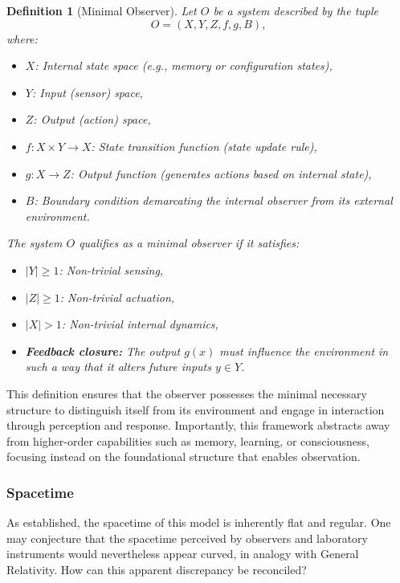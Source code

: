 \documentclass{ijuc}
\newtheorem{definition}{Definition}[section]
\begin{document}
\begin{definition}[Minimal Observer]
Let $O$ be a system described by the tuple
\[
O = (X, Y, Z, f, g, B),
\]
where:
\begin{itemize}
    \item $X$: Internal state space (e.g., memory or configuration states),
    \item $Y$: Input (sensor) space,
    \item $Z$: Output (action) space,
    \item $f: X \times Y \rightarrow X$: State transition function (state update rule),
    \item $g: X \rightarrow Z$: Output function (generates actions based on internal state),
    \item $B$: Boundary condition demarcating the internal observer from its external environment.
\end{itemize}

The system $O$ qualifies as a \emph{minimal observer} if it satisfies:
\begin{itemize}
    \item $|Y| \geq 1$: Non-trivial sensing,
    \item $|Z| \geq 1$: Non-trivial actuation,
    \item $|X| > 1$: Non-trivial internal dynamics,
    \item \textbf{Feedback closure:} The output $g(x)$ must influence the environment in such a way that it alters future inputs $y \in Y$.
\end{itemize}
\end{definition}

This definition ensures that the observer possesses the minimal necessary structure to distinguish itself from its environment and engage in interaction through perception and response. 
Importantly, this framework abstracts away from higher-order capabilities such as memory, learning, or consciousness, focusing instead on the foundational structure that enables observation.

\subsubsection{Spacetime}
As established, the spacetime of this model is inherently flat and regular. 
One may conjecture that the spacetime perceived by observers and laboratory instruments would nevertheless appear curved, in analogy with General Relativity. 
How can this apparent discrepancy be reconciled?  
\end{document}
